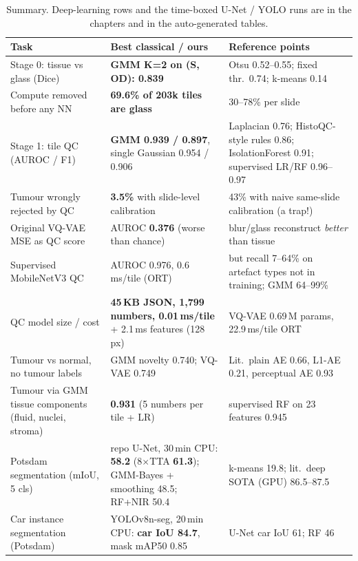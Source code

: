 \begin{table}[H]\centering\small
\begin{tabular}{p{5.3cm}p{5.2cm}p{5.4cm}}\toprule
\textbf{Task} & \textbf{Best classical / ours} & \textbf{Reference points}\\\midrule
Stage 0: tissue vs glass (Dice) & \textbf{GMM K=2 on (S, OD): 0.839} & Otsu 0.52--0.55; fixed thr.\ 0.74; k-means 0.14\\
Compute removed before any NN & \textbf{69.6\% of 203k tiles are glass} & 30--78\% per slide\\
Stage 1: tile QC (AUROC / F1) & \textbf{GMM 0.939 / 0.897}, single Gaussian 0.954 / 0.906 & Laplacian 0.76; HistoQC-style rules 0.86; IsolationForest 0.91; supervised LR/RF 0.96--0.97\\
Tumour wrongly rejected by QC & \textbf{3.5\%} with slide-level calibration & 43\% with naive same-slide calibration (a trap!)\\
Original VQ-VAE MSE as QC score & AUROC \textbf{0.376} (worse than chance) & blur/glass reconstruct \emph{better} than tissue\\
Supervised MobileNetV3 QC & AUROC 0.976, 0.6\,ms/tile (ORT) & but recall 7--64\% on artefact types not in training; GMM 64--99\%\\
QC model size / cost & \textbf{45\,KB JSON, 1{,}799 numbers, 0.01\,ms/tile} + 2.1\,ms features (128\,px) & VQ-VAE 0.69\,M params, 22.9\,ms/tile ORT\\
Tumour vs normal, no tumour labels & GMM novelty 0.740; VQ-VAE 0.749 & Lit.\ plain AE 0.66, L1-AE 0.21, perceptual AE 0.93\\
Tumour via GMM tissue components (fluid, nuclei, stroma) & \textbf{0.931} (5 numbers per tile + LR) & supervised RF on 23 features 0.945\\
Potsdam segmentation (mIoU, 5 cls) & repo U-Net, 30\,min CPU: \textbf{58.2} (8$\times$TTA \textbf{61.3}); GMM-Bayes + smoothing 48.5; RF+NIR 50.4 & k-means 19.8; lit.\ deep SOTA (GPU) 86.5--87.5\\
Car instance segmentation (Potsdam) & YOLOv8n-seg, 20\,min CPU: \textbf{car IoU 84.7}, mask mAP50 0.85 & U-Net car IoU 61; RF 46\\
\bottomrule\end{tabular}\caption{Summary. Deep-learning rows and the time-boxed U-Net / YOLO runs are in the
chapters and in the auto-generated tables.}\end{table}

